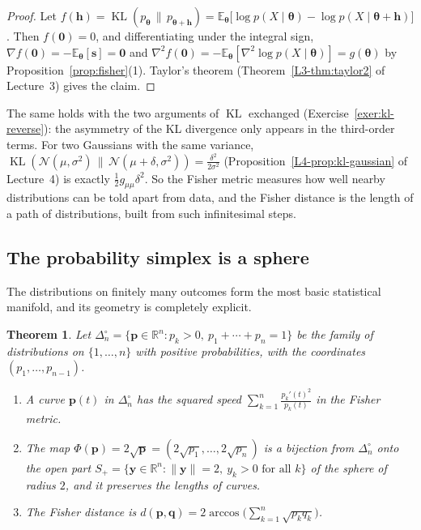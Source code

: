 \documentclass[11pt]{article}
\newcommand{\norm}[1]{\lVert #1 \rVert}
\newcommand{\E}{\mathbb{E}}
\theoremstyle{definition}
\theoremstyle{plain}
\newtheorem{theorem}[definition]{Theorem}
\theoremstyle{remark}
\DeclareMathOperator{\KL}{KL}
\begin{document}
\begin{proof}
    Let $f(\mathbf{h}) = \KL(p_{\boldsymbol{\theta}} \,\|\, p_{\boldsymbol{\theta} + \mathbf{h}}) = \E_{\boldsymbol{\theta}}\big[\log p(X \mid \boldsymbol{\theta}) - \log p(X \mid \boldsymbol{\theta} + \mathbf{h})\big]$. Then $f(\mathbf{0}) = 0$, and differentiating under the integral sign, $\nabla f(\mathbf{0}) = -\E_{\boldsymbol{\theta}}[\mathbf{s}] = \mathbf{0}$ and $\nabla^2 f(\mathbf{0}) = -\E_{\boldsymbol{\theta}}[\nabla^2\log p(X \mid \boldsymbol{\theta})] = g(\boldsymbol{\theta})$ by Proposition~\ref{prop:fisher}(1). Taylor's theorem (Theorem~\ref{L3-thm:taylor2} of Lecture~3) gives the claim.
\end{proof}

The same holds with the two arguments of $\KL$ exchanged (Exercise~\ref{exer:kl-reverse}): the asymmetry of the KL divergence only appears in the third-order terms. For two Gaussians with the same variance, $\KL(\mathcal{N}(\mu, \sigma^2) \,\|\, \mathcal{N}(\mu + \delta, \sigma^2)) = \frac{\delta^2}{2\sigma^2}$ (Proposition~\ref{L4-prop:kl-gaussian} of Lecture~4) is exactly $\frac{1}{2}g_{\mu\mu}\delta^2$. So the Fisher metric measures how well nearby distributions can be told apart from data, and the Fisher distance is the length of a path of distributions, built from such infinitesimal steps.

\subsection{The probability simplex is a sphere}

The distributions on finitely many outcomes form the most basic statistical manifold, and its geometry is completely explicit.

\begin{theorem}\label{thm:simplex-sphere}
    Let $\Delta_n^\circ = \{\mathbf{p} \in \mathbb{R}^n : p_k > 0, \ p_1 + \cdots + p_n = 1\}$ be the family of distributions on $\{1, \ldots, n\}$ with positive probabilities, with the coordinates $(p_1, \ldots, p_{n-1})$.
    \begin{enumerate}
        \item A curve $\mathbf{p}(t)$ in $\Delta_n^\circ$ has the squared speed $\sum_{k=1}^n \frac{p_k'(t)^2}{p_k(t)}$ in the Fisher metric.
        \item The map $\Phi(\mathbf{p}) = 2\sqrt{\mathbf{p}} = (2\sqrt{p_1}, \ldots, 2\sqrt{p_n})$ is a bijection from $\Delta_n^\circ$ onto the open part $S_+ = \{\mathbf{y} \in \mathbb{R}^n : \norm{\mathbf{y}} = 2, \ y_k > 0 \text{ for all } k\}$ of the sphere of radius $2$, and it preserves the lengths of curves.
        \item The Fisher distance is $d(\mathbf{p}, \mathbf{q}) = 2\arccos\big(\sum_{k=1}^n \sqrt{p_kq_k}\big)$.
    \end{enumerate}
\end{theorem}
\end{document}
